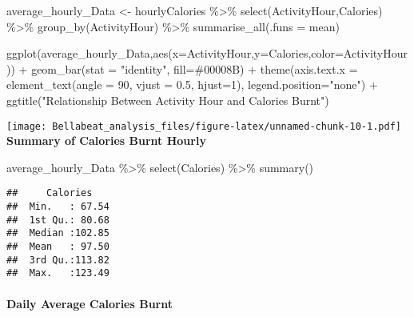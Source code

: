 \documentclass[
]{article}
\newenvironment{Shaded}{\begin{snugshade}}{\end{snugshade}}
\newcommand{\AttributeTok}[1]{\textcolor[rgb]{0.77,0.63,0.00}{#1}}
\newcommand{\DecValTok}[1]{\textcolor[rgb]{0.00,0.00,0.81}{#1}}
\newcommand{\FloatTok}[1]{\textcolor[rgb]{0.00,0.00,0.81}{#1}}
\newcommand{\FunctionTok}[1]{\textcolor[rgb]{0.00,0.00,0.00}{#1}}
\newcommand{\NormalTok}[1]{#1}
\newcommand{\OtherTok}[1]{\textcolor[rgb]{0.56,0.35,0.01}{#1}}
\newcommand{\SpecialCharTok}[1]{\textcolor[rgb]{0.00,0.00,0.00}{#1}}
\newcommand{\StringTok}[1]{\textcolor[rgb]{0.31,0.60,0.02}{#1}}
\begin{document}
\begin{Shaded}
\begin{Highlighting}[]
\NormalTok{average\_hourly\_Data }\OtherTok{\textless{}{-}}\NormalTok{ hourlyCalories }\SpecialCharTok{\%\textgreater{}\%} 
  \FunctionTok{select}\NormalTok{(ActivityHour,Calories) }\SpecialCharTok{\%\textgreater{}\%} 
  \FunctionTok{group\_by}\NormalTok{(ActivityHour) }\SpecialCharTok{\%\textgreater{}\%} 
  \FunctionTok{summarise\_all}\NormalTok{(}\AttributeTok{.funs =}\NormalTok{ mean)}

\FunctionTok{ggplot}\NormalTok{(average\_hourly\_Data,}\FunctionTok{aes}\NormalTok{(}\AttributeTok{x=}\NormalTok{ActivityHour,}\AttributeTok{y=}\NormalTok{Calories,}\AttributeTok{color=}\NormalTok{ActivityHour)) }\SpecialCharTok{+} 
  \FunctionTok{geom\_bar}\NormalTok{(}\AttributeTok{stat =} \StringTok{"identity"}\NormalTok{, }\AttributeTok{fill=}\StringTok{\textquotesingle{}\#00008B\textquotesingle{}}\NormalTok{) }\SpecialCharTok{+}
  \FunctionTok{theme}\NormalTok{(}\AttributeTok{axis.text.x =} \FunctionTok{element\_text}\NormalTok{(}\AttributeTok{angle =} \DecValTok{90}\NormalTok{, }\AttributeTok{vjust =} \FloatTok{0.5}\NormalTok{, }\AttributeTok{hjust=}\DecValTok{1}\NormalTok{),}
        \AttributeTok{legend.position=}\StringTok{"none"}\NormalTok{) }\SpecialCharTok{+}
  \FunctionTok{ggtitle}\NormalTok{(}\StringTok{"Relationship Between Activity Hour and Calories Burnt"}\NormalTok{)}
\end{Highlighting}
\end{Shaded}

\texttt{[image: Bellabeat\_analysis\_files/figure-latex/unnamed-chunk-10-1.pdf]}\\
\textbf{Summary of Calories Burnt Hourly}

\begin{Shaded}
\begin{Highlighting}[]
\NormalTok{average\_hourly\_Data }\SpecialCharTok{\%\textgreater{}\%} 
  \FunctionTok{select}\NormalTok{(Calories) }\SpecialCharTok{\%\textgreater{}\%} 
  \FunctionTok{summary}\NormalTok{()}
\end{Highlighting}
\end{Shaded}

\begin{verbatim}
##     Calories     
##  Min.   : 67.54  
##  1st Qu.: 80.68  
##  Median :102.85  
##  Mean   : 97.50  
##  3rd Qu.:113.82  
##  Max.   :123.49
\end{verbatim}

\hypertarget{daily-average-calories-burnt}{%
\paragraph{Daily Average Calories
Burnt}\label{daily-average-calories-burnt}}
\end{document}
